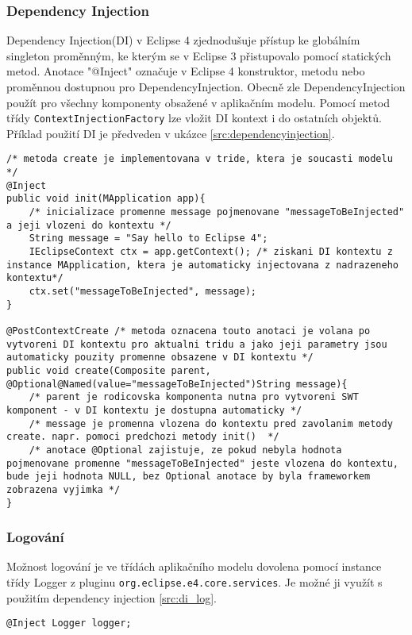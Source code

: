 \documentclass[ing,male,java,dept460]{diploma}		%
\begin{document}
\subsubsection{Dependency Injection}
Dependency Injection(DI) v Eclipse 4 zjednodušuje přístup ke globálním singleton proměnným, ke kterým se v Eclipse 3 přistupovalo pomocí statických metod. Anotace "@Inject" označuje v Eclipse 4 konstruktor, metodu nebo proměnnou dostupnou pro DependencyInjection. Obecně zle DependencyInjection použít pro všechny komponenty obsažené v aplikačním modelu. Pomocí metod třídy \texttt{ContextInjectionFactory} lze vložit DI kontext i do ostatních objektů. Příklad použití DI je předveden v ukázce \ref{src:dependencyinjection}.
\begin{lstlisting}[label=src:dependencyinjection,caption=Ukázka Dependency Injection v E4]
/* metoda create je implementovana v tride, ktera je soucasti modelu */
@Inject
public void init(MApplication app){
	/* inicializace promenne message pojmenovane "messageToBeInjected" a jeji vlozeni do kontextu */
	String message = "Say hello to Eclipse 4";
	IEclipseContext ctx = app.getContext(); /* ziskani DI kontextu z instance MApplication, ktera je automaticky injectovana z nadrazeneho kontextu*/
	ctx.set("messageToBeInjected", message);
}

@PostContextCreate /* metoda oznacena touto anotaci je volana po vytvoreni DI kontextu pro aktualni tridu a jako jeji parametry jsou automaticky pouzity promenne obsazene v DI kontextu */
public void create(Composite parent, @Optional@Named(value="messageToBeInjected")String message){
	/* parent je rodicovska komponenta nutna pro vytvoreni SWT komponent - v DI kontextu je dostupna automaticky */
	/* message je promenna vlozena do kontextu pred zavolanim metody create. napr. pomoci predchozi metody init()  */
	/* anotace @Optional zajistuje, ze pokud nebyla hodnota pojmenovane promenne "messageToBeInjected" jeste vlozena do kontextu, bude jeji hodnota NULL, bez Optional anotace by byla frameworkem zobrazena vyjimka */
}

\end{lstlisting}
\subsubsection{Logování}
Možnost logování je ve třídách aplikačního modelu dovolena pomocí instance třídy Logger z pluginu \texttt{org.eclipse.e4.core.services}. Je možné ji využít s použitím dependency injection \ref{src:di_log}.
\begin{lstlisting}[label=src:di_log, caption=Vložení Logger pomocí DI]
@Inject Logger logger; 
\end{lstlisting}
\end{document}
